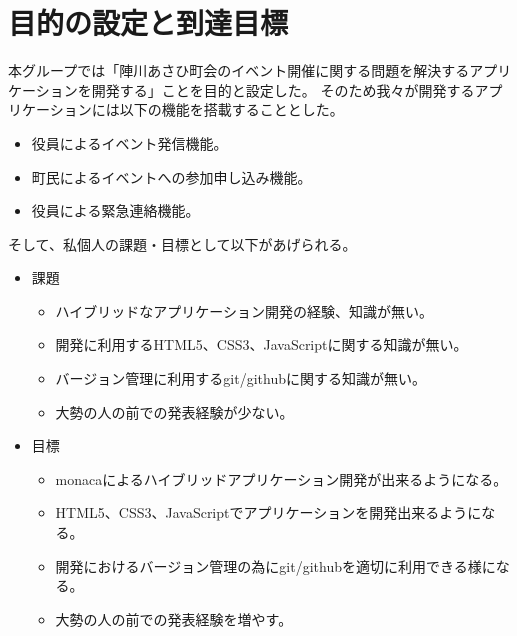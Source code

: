 \section{目的の設定と到達目標}
本グループでは「陣川あさひ町会のイベント開催に関する問題を解決するアプリケーションを開発する」ことを目的と設定した。
そのため我々が開発するアプリケーションには以下の機能を搭載することとした。
\begin{itemize}
    \item 役員によるイベント発信機能。
    \item 町民によるイベントへの参加申し込み機能。
    \item 役員による緊急連絡機能。
\end{itemize}
そして、私個人の課題・目標として以下があげられる。
\begin{itemize}
    \item 課題
    \begin{itemize}
        \item ハイブリッドなアプリケーション開発の経験、知識が無い。
        \item 開発に利用するHTML5、CSS3、JavaScriptに関する知識が無い。
        \item バージョン管理に利用するgit/githubに関する知識が無い。
        \item 大勢の人の前での発表経験が少ない。
    \end{itemize}

    \item 目標
    \begin{itemize}
        \item monacaによるハイブリッドアプリケーション開発が出来るようになる。
        \item HTML5、CSS3、JavaScriptでアプリケーションを開発出来るようになる。
        \item 開発におけるバージョン管理の為にgit/githubを適切に利用できる様になる。
        \item 大勢の人の前での発表経験を増やす。
    \end{itemize}
\end{itemize}
